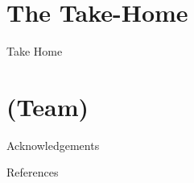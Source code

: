\documentclass{beamer}
\begin{document}
\section{The Take-Home}

\begin{frame}
Take Home
\end{frame}

\section*{(Team)}

\begin{frame}
Acknowledgements
\end{frame}



\begin{frame}
References
\end{frame}
\end{document}
